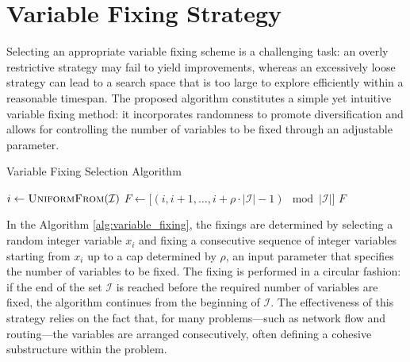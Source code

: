 \section{Variable Fixing Strategy}\label{sec:PACS_var_fix}
Selecting an appropriate variable fixing scheme is a challenging task: an overly restrictive strategy may fail to yield improvements, whereas an excessively loose strategy can lead to a search space that is too large to explore efficiently within a reasonable timespan.
The proposed algorithm constitutes a simple yet intuitive variable fixing method: it incorporates randomness to promote diversification and allows for controlling the number of variables to be fixed through an adjustable parameter.
\begin{algorithm}
\caption{Variable Fixing Selection Algorithm}\label{alg:variable_fixing}
\begin{algorithmic}[1]
    \State $i \gets \Call{UniformFrom}{\mathcal{I}}$
    \State $F \gets \big[(i,i+1,\dots,i+\rho\cdot|\mathcal{I}| -1) \mod |\mathcal{I}|\big]$
    \State \Return $F$
\EndFunction
\end{algorithmic}
\end{algorithm}
In the Algorithm \ref{alg:variable_fixing}, the fixings are determined by selecting a random integer variable $x_i$ and fixing a consecutive sequence of integer variables starting from $x_i$ up to a cap determined by $\rho$, an input parameter that specifies the number of variables to be fixed.
The fixing is performed in a circular fashion: if the end of the set $\mathcal{I}$ is reached before the required number of variables are fixed, the algorithm continues from the beginning of $\mathcal{I}$.
The effectiveness of this strategy relies on the fact that, for many problems—such as network flow and routing—the variables are arranged consecutively, often defining a cohesive substructure within the problem.
